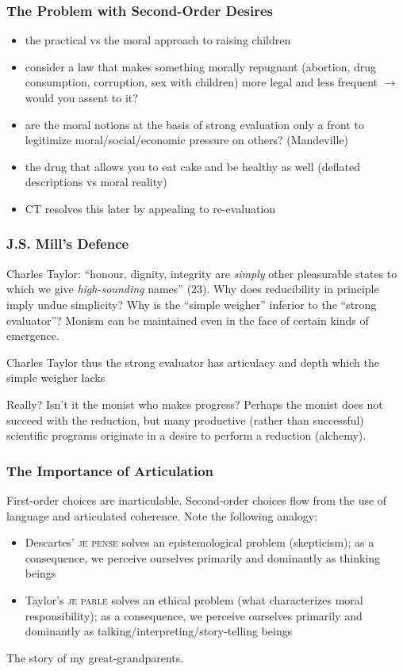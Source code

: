 \documentclass[xcolor=dvipsnames]{beamer}
\begin{document}
\begin{frame}
  \frametitle{The Problem with Second-Order Desires}
\begin{itemize}
\item the practical vs the moral approach to raising children
\item consider a law that makes something morally repugnant
  (abortion, drug consumption, corruption, sex with children) more
  legal and less frequent $\longrightarrow$ would you assent to it?
\item are the moral notions at the basis of strong evaluation only
  a front to legitimize moral/social/economic pressure on others?
  (Mandeville)
\item the drug that allows you to eat cake and be healthy as well
  (deflated descriptions vs moral reality)
\item CT resolves this later by appealing to re-evaluation
\end{itemize}
\end{frame}

\begin{frame}
  \frametitle{J.S. Mill's Defence}
  Charles Taylor: ``honour, dignity, integrity are \emph{simply}
  other pleasurable states to which we give \emph{high-sounding}
  names'' (23). Why does reducibility in principle imply undue
  simplicity? Why is the ``simple weigher'' inferior to the
  ``strong evaluator''? Monism can be maintained even in the face
  of certain kinds of emergence.
  \begin{block}{Charles Taylor}
    thus the strong evaluator has articulacy and depth which the
    simple weigher lacks
  \end{block}
Really? Isn't it the monist who makes progress? Perhaps the monist
does not succeed with the reduction, but many productive (rather
than successful) scientific programs originate in a desire to
perform a reduction (alchemy). 
\end{frame}

\begin{frame}
  \frametitle{The Importance of Articulation}
  First-order choices are inarticulable. Second-order choices flow
  from the use of language and articulated coherence. Note the
  following analogy:
  \begin{itemize}
  \item Descartes' \textsc{je pense} solves an epistemological
    problem (skepticism); as a consequence, we perceive ourselves
    primarily and dominantly as thinking beings
  \item Taylor's \textsc{je parle} solves an ethical problem (what
    characterizes moral responsibility); as a consequence, we
    perceive ourselves primarily and dominantly as
    talking/interpreting/story-telling beings
  \end{itemize}
The story of my great-grandparents. 
\end{frame}
\end{document}
